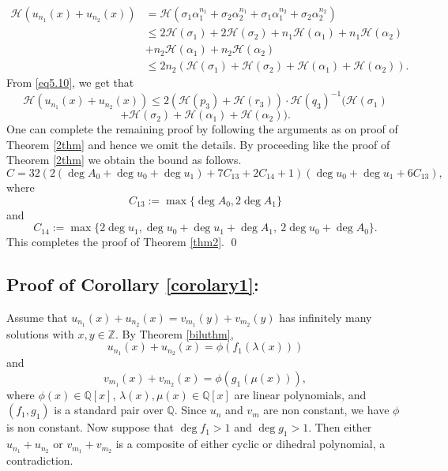 \documentclass[12pt]{amsart}
\newcommand{\Z}{\mbox{$\mathbb Z$}}
\newcommand{\Q}{\mbox{$\mathbb Q$}}
\begin{document}
		\begin{align*}
			\mathcal{H}(u_{n_1}(x)+u_{n_2}(x))&=\mathcal{H}(\sigma_1\alpha_1^{n_1}+\sigma_2\alpha_2^{n_1}+\sigma_1\alpha_1^{n_2}+\sigma_2\alpha_2^{n_2})\\
			&\leq 2\mathcal{H}(\sigma_1)+2\mathcal{H}(\sigma_2)+n_1\mathcal{H}(\alpha_1)+n_1\mathcal{H}(\alpha_2)\\
			&+n_2\mathcal{H}(\alpha_1)+n_2\mathcal{H}(\alpha_2)\\
			&\leq 2n_2 (\mathcal{H}(\sigma_1)+\mathcal{H}(\sigma_2)+\mathcal{H}(\alpha_1)+\mathcal{H}(\alpha_2)).
		\end{align*}
		From \eqref{eq5.10}, we get that
		\begin{equation*}\label{eq21}
		\mathcal{H}(u_{n_1}(x)+u_{n_2}(x))\leq 2(\mathcal{H}(p_3)+\mathcal{H}(r_3))\cdot \mathcal{H}(q_3)^{-1}(\mathcal{H}(\sigma_1) 
		\end{equation*}
        \begin{equation*}
            +\mathcal{H}(\sigma_2)+\mathcal{H}(\alpha_1)+\mathcal{H}(\alpha_2)).
        \end{equation*}
        One can complete the remaining proof by following the arguments as on proof of Theorem \ref{2thm} and hence we omit the details.
By proceeding like the proof of Theorem \ref{2thm} we obtain the  bound as follows.
\[
C = 32 \left(2(\deg A_0 + \deg u_0 + \deg u_1) + 7C_{13} + 2C_{14} + 1\right) (\deg u_0 + \deg u_1 + 6C_{13}),
\] where 
$$C_{13} := \max\{\deg A_0, 2\deg A_1\}$$
and
\[
C_{14} := \max\{2\deg u_{1}, \deg u_{0}+\deg u_{1}+\deg A_{1},\ 2\deg u_{0}+\deg A_{0}\}.
\] This completes the proof of Theorem \ref{thm2}. \qed
\subsection{Proof of Corollary \ref{corolary1}:} Assume that $u_{n_1}(x)+u_{n_2}(x)=v_{m_1}(y)+v_{m_2}(y)$ has infinitely many solutions with $x,y \in \Z$. By Theorem \ref{biluthm}, 
	\begin{equation}\label{eq5.6}
		u_{n_1}(x)+u_{n_2}(x)=\phi(f_1(\lambda(x)))
	\end{equation} and 
	\begin{equation}\label{eq5.7}
		v_{m_1}(x)+v_{m_2}(x)=\phi(g_1(\mu(x))), 
	\end{equation} where $\phi(x)\in \Q[x]$, $\lambda(x),\mu(x)\in \Q[x]$ are linear polynomials, and $(f_1,g_1)$ is a standard pair over $\Q$. Since $u_n$ and $v_m$ are non constant, we have $\phi$ is non constant. Now suppose that $\deg f_1>1$ and $\deg g_1>1$. Then either $u_{n_1}+u_{n_2}$ or $v_{m_1}+v_{m_2}$ is a composite of either cyclic or dihedral polynomial, a contradiction. 
	
\end{document}
